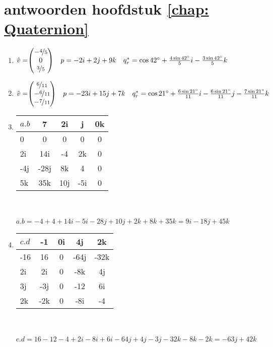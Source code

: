 \documentclass[hidelinks, a4wide, 12pt,  twoside]{book}
\begin{document}
\section{antwoorden  hoofdstuk \ref{chap: Quaternion}}
\begin{enumerate}
	\item 
	$\hat{v} = \vecdrie{-\nicefrac{4}{5}}{0}{\nicefrac{3}{5}}
	\quad p  = -2i +2j + 9k 
	\quad q^*_r  =  \cos 42 \degree  + \frac{4 \sin 42 \degree}{5}i -
	\frac{3 \sin 42 \degree}{5}k$
	
	\item 
	$\hat{v} = \vecdrie{\nicefrac{6}{11}}{-\nicefrac{6}{11}}{-\nicefrac{7}{11}}
	\quad p  = -23i +15j + 7k 
	\quad q^*_r  =  \cos 21 \degree  + \frac{6 \sin 21 \degree}{11}i 
	-\frac{6 \sin 21 \degree}{11}j
	-\frac{7 \sin 21 \degree}{11}k$
	
	\item
	\begin{tabular}{ | l || c | c |c |c |}
		\hline
		$ a.b $ & 7 & 2i   & j & 0k \\ \hline \hline
		0    & 0 & 0   &   0        & 0  \\ \hline
		2i    & 14i & -4   &   2k        & 0  \\ \hline
		-4j   & -28j &  8k &   4     & 0\\ \hline
		5k    & 35k  & 10j   & -5i   & 0\\ 
		\hline 
	\end{tabular} \\ \\
	$ a.b = -4 + 4 +14i -5i -28j +10j +2k + 8k + 35k =  9i -18j +45k $
	
	\item
	\begin{tabular}{ | l || c | c |c |c |}
		\hline
		$ c.d $ & -1 & 0i   & 4j & 2k \\ \hline \hline
		-16    & 16 & 0   &   -64j        & -32k  \\ \hline
		2i    & 2i & 0   &   -8k        & 4j  \\ \hline
		3j   & -3j &  0 &   -12     & 6i\\ \hline
		2k    & -2k  & 0   & -8i   & -4\\ 
		\hline 
	\end{tabular} \\ \\
	$ c.d = 16 -12  -4  + 2i -8i +6i  -64j +4j -3j  -32k - 8k -2k =  -63j + 42k $
	

\end{enumerate}
\end{document}
